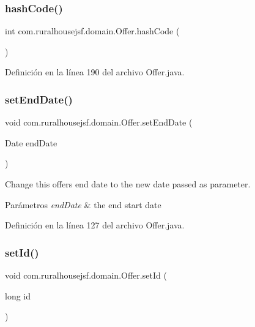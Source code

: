 \subsubsection{\texorpdfstring{hashCode()}{hashCode()}}
{\footnotesize\ttfamily int com.\+ruralhousejsf.\+domain.\+Offer.\+hash\+Code (\begin{DoxyParamCaption}{ }\end{DoxyParamCaption})}



Definición en la línea 190 del archivo Offer.\+java.

\mbox{\label{a00184_a4ee5091e976e14c9b34817e1c8225e01}} 
\subsubsection{\texorpdfstring{setEndDate()}{setEndDate()}}
{\footnotesize\ttfamily void com.\+ruralhousejsf.\+domain.\+Offer.\+set\+End\+Date (\begin{DoxyParamCaption}\item[{Date}]{end\+Date }\end{DoxyParamCaption})}



Change this offers end date to the new date passed as parameter. 


\begin{DoxyParams}{Parámetros}
{\em end\+Date} & the end start date \\
\hline
\end{DoxyParams}


Definición en la línea 127 del archivo Offer.\+java.

\mbox{\label{a00184_a470323b09c0c64417eb21c748d008045}} 
\subsubsection{\texorpdfstring{setId()}{setId()}}
{\footnotesize\ttfamily void com.\+ruralhousejsf.\+domain.\+Offer.\+set\+Id (\begin{DoxyParamCaption}\item[{long}]{id }\end{DoxyParamCaption})}



